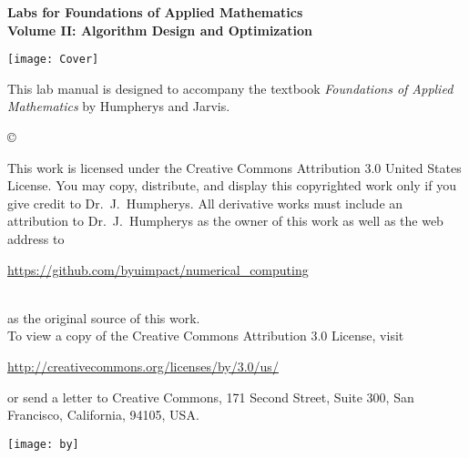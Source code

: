\documentclass[nociteref]{SIAM-GH-book}
\begin{document}
\thispagestyle{empty}

\begin{center}
{\huge \bf Labs for Foundations of Applied Mathematics} \\
\vspace{5mm}
{\Large \bf Volume II: Algorithm
Design and Optimization}
\vspace{20mm}

\texttt{[image: Cover]}
\end{center}
\frontmatter




\begin{thepreface}
This lab manual is designed to accompany the textbook \emph{Foundations of Applied Mathematics} by Humpherys and Jarvis.

\vfill
\copyright{This work is licensed under the Creative Commons Attribution 3.0 United States
License.  You may copy, distribute, and display this copyrighted work only if you give
credit to Dr.~J.~Humpherys. All derivative works must include an attribution to Dr.~J.~Humpherys as the owner of this work as well as the web address to
\\\centerline{\url{https://github.com/byuimpact/numerical_computing}}\\ as the original source of
this
work.\\To view a copy of the Creative Commons Attribution 3.0 License,
visit\\\centerline{\url{http://creativecommons.org/licenses/by/3.0/us/}} or send a letter to
Creative Commons, 171 Second Street, Suite 300, San Francisco, California, 94105, USA.}

\vfill
\centering\texttt{[image: by]}
\vfill
\end{thepreface}

\setcounter{tocdepth}{1}
\tableofcontents

\mainmatter
\end{document}
